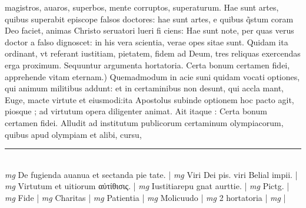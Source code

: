 \documentclass{article}
\begin{document}
\begin{pages}
magistros, auaros, superbos, mente corruptos, superaturum. Hae sunt artes, quibus superabit episcope falsos doctores: hae sunt artes, e quibus q̃stum coram Deo faciet, animas Christo seruatori lueri fi ciens: Hae sunt note, per quas verus doctor a falso dignoscet: in his vera scientia, verae opes sitae sunt. Quidam ita ordinant, vt referant iustitiam, pietatem, fidem ad Deum, tres reliquas exercendas erga proximum. Sequuntur argumenta hortatoria.  \pend\pstart Certa bonum certamen fidei, apprehende vitam eternam.) Quemadmodum in acie suni quidam vocati optiones, qui animum militibus addunt: et in certaminibus non desunt, qui accla mant, Euge, macte virtute et eiusmodi:ita Apostolus subinde optionem hoc pacto agit, piosque ; ad virtutum opera diligenter animat. Ait itaque : Certa bonum certamen fidei. Alludit ad institutum publicorum certaminum olympiacorum, quibus apud olympiam et alibi, cursu,  \pend
\vspace{0.5cm}\noindent
\vspace{0.2cm}\rule{1cm}{0.2pt}\\ 
\hspace{0.2cm}\textit{mg}
\footnotesize De fugienda auanua et sectanda pie tate. 
\normalsize| 
\hspace{0.2cm}\textit{mg}
\footnotesize Viri Dei pis. viri Belial impii. 
\normalsize| 
\hspace{0.2cm}\textit{mg}
\footnotesize Virtutum et uitiorum αὐτίθισις. 
\normalsize| 
\hspace{0.2cm}\textit{mg}
\footnotesize Iustitiarepu gnat aurttie. 
\normalsize| 
\hspace{0.2cm}\textit{mg}
\footnotesize Pictg. 
\normalsize| 
\hspace{0.2cm}\textit{mg}
\footnotesize Fide 
\normalsize| 
\hspace{0.2cm}\textit{mg}
\footnotesize Charitas 
\normalsize| 
\hspace{0.2cm}\textit{mg}
\footnotesize Patientia 
\normalsize| 
\hspace{0.2cm}\textit{mg}
\footnotesize Molicuudo 
\normalsize| 
\hspace{0.2cm}\textit{mg}
\footnotesize 2 hortatoria 
\normalsize| 
\hspace{0.2cm}\textit{mg}
\footnotesize   
\normalsize| 

\end{pages}
\end{document}
